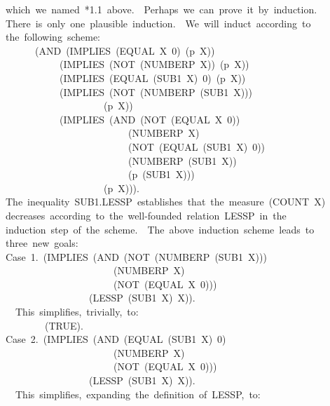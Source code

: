 \documentclass[11pt]{book}
\newenvironment{pubasis}{\begin{flushleft}\ttfamily\small}{\normalsize\rmfamily\end{flushleft}}
\begin{document}
\begin{pubasis}
which~we~named~*1.1~above.~~Perhaps~we~can~prove~it~by~induction.\\
There~is~only~one~plausible~induction.~~We~will~induct~according~to\\
the~following~scheme:\\
~~~~~~(AND~(IMPLIES~(EQUAL~X~0)~(p~X))\\
~~~~~~~~~~~(IMPLIES~(NOT~(NUMBERP~X))~(p~X))\\
~~~~~~~~~~~(IMPLIES~(EQUAL~(SUB1~X)~0)~(p~X))\\
~~~~~~~~~~~(IMPLIES~(NOT~(NUMBERP~(SUB1~X)))\\
~~~~~~~~~~~~~~~~~~~~(p~X))\\
~~~~~~~~~~~(IMPLIES~(AND~(NOT~(EQUAL~X~0))\\
~~~~~~~~~~~~~~~~~~~~~~~~~(NUMBERP~X)\\
~~~~~~~~~~~~~~~~~~~~~~~~~(NOT~(EQUAL~(SUB1~X)~0))\\
~~~~~~~~~~~~~~~~~~~~~~~~~(NUMBERP~(SUB1~X))\\
~~~~~~~~~~~~~~~~~~~~~~~~~(p~(SUB1~X)))\\
~~~~~~~~~~~~~~~~~~~~(p~X))).\\
The~inequality~SUB1.LESSP~establishes~that~the~measure~(COUNT~X)\\
decreases~according~to~the~well-founded~relation~LESSP~in~the\\
induction~step~of~the~scheme.~~The~above~induction~scheme~leads~to\\
three~new~goals:\\

Case~1.~(IMPLIES~(AND~(NOT~(NUMBERP~(SUB1~X)))\\
~~~~~~~~~~~~~~~~~~~~~~(NUMBERP~X)\\
~~~~~~~~~~~~~~~~~~~~~~(NOT~(EQUAL~X~0)))\\
~~~~~~~~~~~~~~~~~(LESSP~(SUB1~X)~X)).\\

~~This~simplifies,~trivially,~to:\\

~~~~~~~~(TRUE).\\

Case~2.~(IMPLIES~(AND~(EQUAL~(SUB1~X)~0)\\
~~~~~~~~~~~~~~~~~~~~~~(NUMBERP~X)\\
~~~~~~~~~~~~~~~~~~~~~~(NOT~(EQUAL~X~0)))\\
~~~~~~~~~~~~~~~~~(LESSP~(SUB1~X)~X)).\\

~~This~simplifies,~expanding~the~definition~of~LESSP,~to:\\


\end{pubasis}
\end{document}
